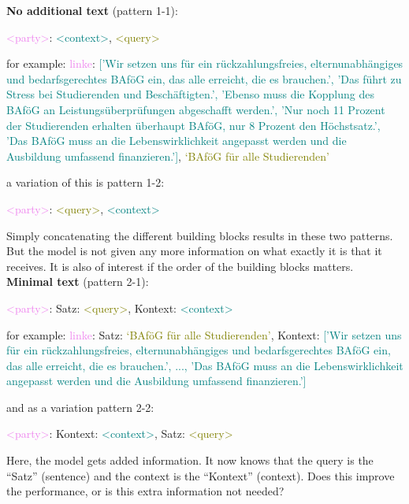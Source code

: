 \textbf{No additional text} (pattern 1-1):

\begin{center}
    \textcolor{violet}{<party>}: \textcolor{teal}{<context>}, \textcolor{olive}{<query>}
\end{center}
for example: \textcolor{violet}{linke}: \textcolor{teal}{['Wir setzen uns für ein rückzahlungsfreies, elternunabhängiges und bedarfsgerechtes BAföG ein, das alle erreicht, die es brauchen.', 'Das führt zu Stress bei Studierenden und Beschäftigten.', 'Ebenso muss die Kopplung des BAföG an Leistungsüberprüfungen abgeschafft werden.', 'Nur noch 11 Prozent der Studierenden erhalten überhaupt BAföG, nur 8 Prozent den Höchstsatz.', 'Das BAföG muss an die Lebenswirklichkeit angepasst werden und die Ausbildung umfassend finanzieren.']}, \textcolor{olive}{‘BAföG für alle Studierenden’}

a variation of this is pattern 1-2:
\begin{center}
    \textcolor{violet}{<party>}: \textcolor{olive}{<query>}, \textcolor{teal}{<context>}
\end{center}

Simply concatenating the different building blocks results in these two patterns. But the model is not given any more information on what exactly it is that it receives. It is also of interest if the order of the building blocks matters.\\

\textbf{Minimal text} (pattern 2-1):

\begin{center}
    \textcolor{violet}{<party>}: Satz: \textcolor{olive}{<query>}, Kontext: \textcolor{teal}{<context>}
\end{center}
for example: \textcolor{violet}{linke}: Satz: \textcolor{olive}{‘BAföG für alle Studierenden’}, Kontext: \textcolor{teal}{['Wir setzen uns für ein rückzahlungsfreies, elternunabhängiges und bedarfsgerechtes BAföG ein, das alle erreicht, die es brauchen.', ..., 'Das BAföG muss an die Lebenswirklichkeit angepasst werden und die Ausbildung umfassend finanzieren.']}

and as a variation pattern 2-2:
\begin{center}
    \textcolor{violet}{<party>}: Kontext: \textcolor{teal}{<context>}, Satz: \textcolor{olive}{<query>}
\end{center}

Here, the model gets added information. It now knows that the query is the ``Satz'' (sentence) and the context is the ``Kontext'' (context). Does this improve the performance, or is this extra information not needed?\\

